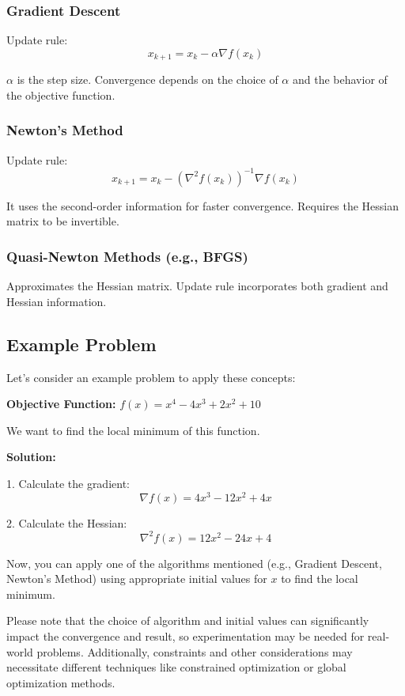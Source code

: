 \documentclass[a4paper]{article}
\begin{document}
\subsubsection{Gradient Descent}

Update rule:
\[
x_{k+1} = x_k - \alpha \nabla f(x_k)
\]

$\alpha$ is the step size. Convergence depends on the choice of $\alpha$ and the behavior of the objective function.

\subsubsection{Newton's Method}

Update rule:
\[
x_{k+1} = x_k - \left(\nabla^2 f(x_k)\right)^{-1} \nabla f(x_k)
\]

It uses the second-order information for faster convergence. Requires the Hessian matrix to be invertible.

\subsubsection{Quasi-Newton Methods (e.g., BFGS)}

Approximates the Hessian matrix. Update rule incorporates both gradient and Hessian information.

\subsection{Example Problem}

Let's consider an example problem to apply these concepts:

\textbf{Objective Function:} $f(x) = x^4 - 4x^3 + 2x^2 + 10$

We want to find the local minimum of this function.

\textbf{Solution:}

1. Calculate the gradient:
\[
\nabla f(x) = 4x^3 - 12x^2 + 4x
\]

2. Calculate the Hessian:
\[
\nabla^2 f(x) = 12x^2 - 24x + 4
\]

Now, you can apply one of the algorithms mentioned (e.g., Gradient Descent, Newton's Method) using appropriate initial values for $x$ to find the local minimum.

Please note that the choice of algorithm and initial values can significantly impact the convergence and result, so experimentation may be needed for real-world problems. Additionally, constraints and other considerations may necessitate different techniques like constrained optimization or global optimization methods.
\end{document}
